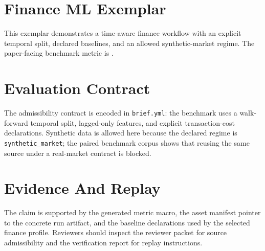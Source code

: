 \documentclass{article}
\begin{document}
\section*{Finance ML Exemplar}

This exemplar demonstrates a time-aware finance workflow with an explicit temporal split, declared baselines, and an allowed synthetic-market regime. The paper-facing benchmark metric is \MetricMean.

\section*{Evaluation Contract}

The admissibility contract is encoded in \texttt{brief.yml}: the benchmark uses a walk-forward temporal split, lagged-only features, and explicit transaction-cost declarations. Synthetic data is allowed here because the declared regime is \texttt{synthetic\_market}; the paired benchmark corpus shows that reusing the same source under a real-market contract is blocked.

\section*{Evidence And Replay}

The claim is supported by the generated metric macro, the asset manifest pointer to the concrete run artifact, and the baseline declarations used by the selected finance profile. Reviewers should inspect the reviewer packet for source admissibility and the verification report for replay instructions.
\end{document}

